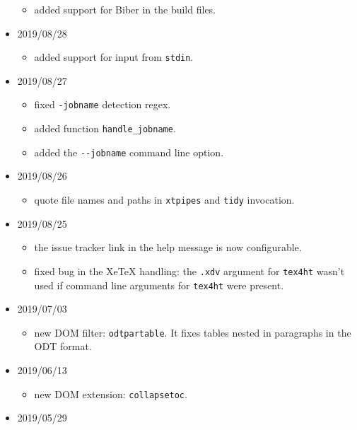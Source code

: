 \begin{itemize}
  \begin{itemize}
  \tightlist
  \item
    added support for Biber in the build files.
  \end{itemize}
\item
  2019/08/28

  \begin{itemize}
  \tightlist
  \item
    added support for input from \texttt{stdin}.
  \end{itemize}
\item
  2019/08/27

  \begin{itemize}
  \tightlist
  \item
    fixed \texttt{-jobname} detection regex.
  \item
    added function \texttt{handle\_jobname}.
  \item
    added the \texttt{-\/-jobname} command line option.
  \end{itemize}
\item
  2019/08/26

  \begin{itemize}
  \tightlist
  \item
    quote file names and paths in \texttt{xtpipes} and \texttt{tidy}
    invocation.
  \end{itemize}
\item
  2019/08/25

  \begin{itemize}
  \tightlist
  \item
    the issue tracker link in the help message is now configurable.
  \item
    fixed bug in the XeTeX handling: the \texttt{.xdv} argument for
    \texttt{tex4ht} wasn't used if command line arguments for
    \texttt{tex4ht} were present.
  \end{itemize}
\item
  2019/07/03

  \begin{itemize}
  \tightlist
  \item
    new DOM filter: \texttt{odtpartable}. It fixes tables nested in
    paragraphs in the ODT format.
  \end{itemize}
\item
  2019/06/13

  \begin{itemize}
  \tightlist
  \item
    new DOM extension: \texttt{collapsetoc}.
  \end{itemize}
\item
  2019/05/29


\end{itemize}
